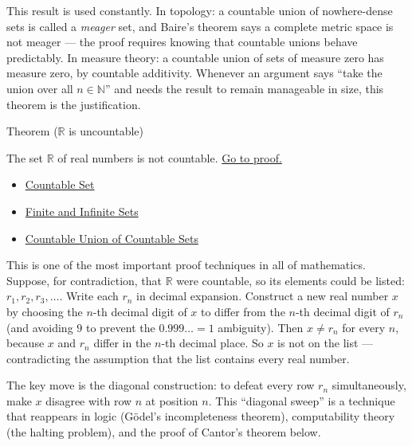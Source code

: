 \begin{remark*}
This result is used constantly. In topology: a countable union of nowhere-dense
sets is called a \emph{meager} set, and Baire's theorem says a complete metric
space is not meager --- the proof requires knowing that countable unions behave
predictably. In measure theory: a countable union of sets of measure zero has
measure zero, by countable additivity. Whenever an argument says ``take the
union over all $n \in \mathbb{N}$'' and needs the result to remain manageable
in size, this theorem is the justification.
\end{remark*}


\begin{theorembox}{Theorem ($\mathbb{R}$ is uncountable)}
\begin{theorem}\label{thm:R-uncountable}
The set $\mathbb{R}$ of real numbers is not countable.
\hyperref[prf:r-uncountable]{Go to proof.}
\end{theorem}
\end{theorembox}

\begin{dependencies}
\begin{itemize}
  \item \hyperref[def:countable]{Countable Set}
  \item \hyperref[def:finite-infinite]{Finite and Infinite Sets}
  \item \hyperref[thm:countable-union]{Countable Union of Countable Sets}
\end{itemize}
\end{dependencies}

\begin{remark*}
This is one of the most important proof techniques in all of mathematics.
Suppose, for contradiction, that $\mathbb{R}$ were countable, so its elements
could be listed: $r_1, r_2, r_3, \dots$. Write each $r_n$ in decimal
expansion. Construct a new real number $x$ by choosing the $n$-th decimal
digit of $x$ to differ from the $n$-th decimal digit of $r_n$ (and avoiding
$9$ to prevent the $0.999\dots = 1$ ambiguity). Then $x \neq r_n$ for every
$n$, because $x$ and $r_n$ differ in the $n$-th decimal place. So $x$ is not
on the list --- contradicting the assumption that the list contains every real
number.

The key move is the diagonal construction: to defeat every row $r_n$
simultaneously, make $x$ disagree with row $n$ at position $n$. This
``diagonal sweep'' is a technique that reappears in logic (G\"{o}del's
incompleteness theorem), computability theory (the halting problem), and the
proof of Cantor's theorem below.
\end{remark*}

